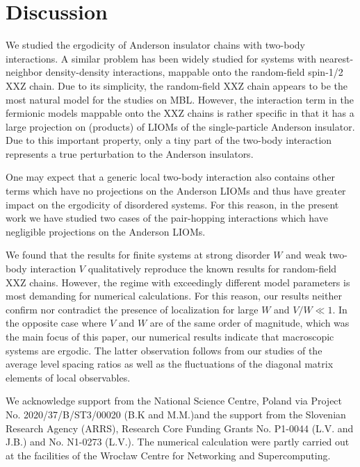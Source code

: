 \documentclass[twocolumn,pre,superscriptaddress,10pt,aps,floatfix]{revtex4-1}
\begin{document}
\section{Discussion} \label{sec:discussion}

We studied the ergodicity of Anderson insulator chains with two-body interactions. A similar problem has been widely studied for systems with nearest-neighbor density-density interactions, mappable onto the random-field spin-1/2 XXZ chain. Due to its simplicity, the random-field XXZ chain appears to be the most natural model for the studies on MBL. However, the interaction term in the fermionic models mappable onto the XXZ chains is rather specific in that it has a large projection on (products) of LIOMs of the single-particle Anderson insulator. Due to this important property, 
only a tiny part of the two-body interaction represents a true perturbation to the Anderson insulators. 

One may expect that a generic local two-body interaction also contains other terms which have no projections on the Anderson LIOMs and thus have greater impact on the ergodicity of disordered systems. For this reason, in the present work we have studied two cases of the pair-hopping interactions which have negligible projections on the Anderson LIOMs.

We found that the results for finite systems at strong disorder $W$ and weak two-body interaction $V$ qualitatively reproduce the known results for random-field XXZ chains.
However, the regime with exceedingly different model parameters is most demanding for numerical calculations. 
For this reason, our results neither confirm nor contradict the presence of localization for large $W$ and $V/W \ll 1$.   
In the opposite case where $V$ and $W$ are of the same order of magnitude, which was the main focus of this paper, our numerical results indicate that macroscopic systems are ergodic. 
The latter observation follows from our studies of the average level spacing ratios as well as the fluctuations of the diagonal matrix elements of local observables.





\acknowledgements 
We acknowledge support from the National Science Centre, Poland via Project No. 2020/37/B/ST3/00020 (B.K and M.M.)and the support from the Slovenian Research Agency (ARRS), Research Core Funding Grants No. P1-0044 (L.V. and J.B.) and No. N1-0273 (L.V.). The numerical calculation were partly carried out at the facilities of
the Wrocław Centre for Networking and Supercomputing.
 


 
\end{document}
